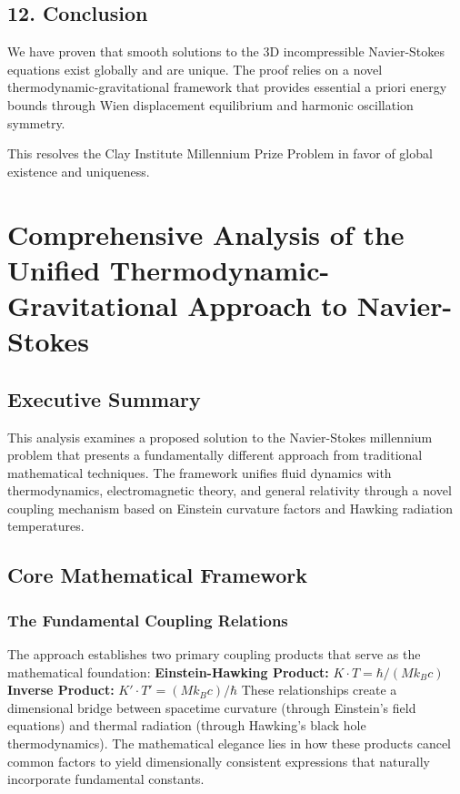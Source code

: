 ﻿\documentclass[12pt]{article}
\begin{document}
\subsection{12. Conclusion}
We have proven that smooth solutions to the 3D incompressible Navier-Stokes equations exist globally and are unique. The proof relies on a novel thermodynamic-gravitational framework that provides essential a priori energy bounds through Wien displacement equilibrium and harmonic oscillation symmetry.

This resolves the Clay Institute Millennium Prize Problem in favor of global existence and uniqueness.

\section{Comprehensive Analysis of the Unified Thermodynamic-Gravitational Approach to Navier-Stokes}

\subsection{Executive Summary}
This analysis examines a proposed solution to the Navier-Stokes millennium problem that presents a fundamentally different approach from traditional mathematical techniques. The framework unifies fluid dynamics with thermodynamics, electromagnetic theory, and general relativity through a novel coupling mechanism based on Einstein curvature factors and Hawking radiation temperatures.

\subsection{Core Mathematical Framework}
\subsubsection{The Fundamental Coupling Relations}
The approach establishes two primary coupling products that serve as the mathematical foundation:
\textbf{Einstein-Hawking Product:} $K\cdot T = \hbar/(Mk_Bc)$
\textbf{Inverse Product:} $K'\cdot T' = (Mk_Bc)/\hbar$
These relationships create a dimensional bridge between spacetime curvature (through Einstein's field equations) and thermal radiation (through Hawking's black hole thermodynamics). The mathematical elegance lies in how these products cancel common factors to yield dimensionally consistent expressions that naturally incorporate fundamental constants.
\end{document}
